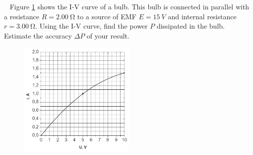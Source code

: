 \documentclass[../TST.tex]{subfiles}
\begin{document}
\begin{pproblem}{\ }
Figure \ref{IV2} shows the I-V curve of a bulb. This bulb is connected in parallel with a resistance $R=\qty{2.00}{\ohm}$ to a source of EMF $E=\qty{15}{V}$ and internal resistance $r=\qty{3.00}{\ohm}$. Using the I-V curve, find the power $P$ dissipated in the bulb. Estimate the accuracy $\Delta P$ of your result.
\begin{figure}[h]
\centering
\hspace{-2em}
    \includegraphics[width=0.5\textwidth]{fig/2007_s4.png}
    \caption{}
  \label{IV2}
\end{figure}
\end{pproblem}
\ifprob \else
\end{document}
